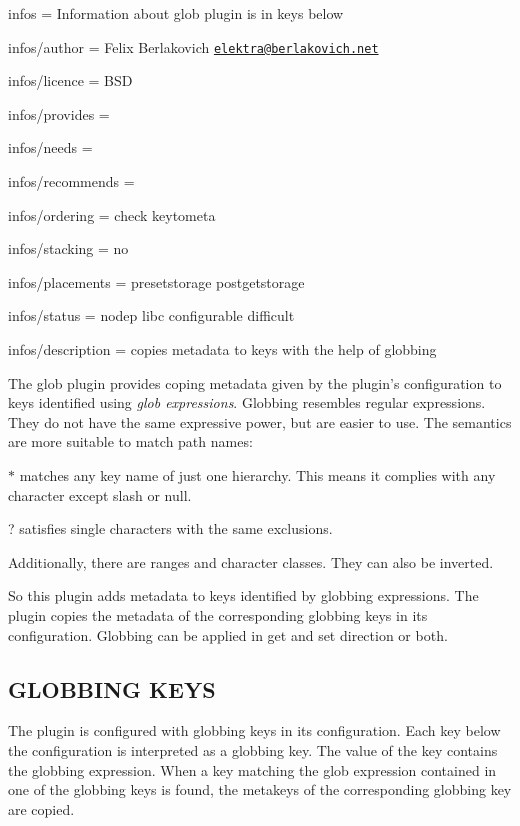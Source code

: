 
\begin{DoxyItemize}
\item infos = Information about glob plugin is in keys below
\item infos/author = Felix Berlakovich \href{mailto:elektra@berlakovich.net}{\tt elektra@berlakovich.\+net}
\item infos/licence = B\+S\+D
\item infos/provides =
\item infos/needs =
\item infos/recommends =
\item infos/ordering = check keytometa
\item infos/stacking = no
\item infos/placements = presetstorage postgetstorage
\item infos/status = nodep libc configurable difficult
\item infos/description = copies metadata to keys with the help of globbing
\end{DoxyItemize}

The glob plugin provides coping metadata given by the plugin's configuration to keys identified using {\itshape glob expressions}. Globbing resembles regular expressions. They do not have the same expressive power, but are easier to use. The semantics are more suitable to match path names\+:


\begin{DoxyItemize}
\item {\ttfamily $\ast$} matches any key name of just one hierarchy. This means it complies with any character except slash or null.
\item {\ttfamily ?} satisfies single characters with the same exclusions.
\item Additionally, there are ranges and character classes. They can also be inverted.
\end{DoxyItemize}

So this plugin adds metadata to keys identified by globbing expressions. The plugin copies the metadata of the corresponding globbing keys in its configuration. Globbing can be applied in get and set direction or both.

\subsection*{G\+L\+O\+B\+B\+I\+N\+G K\+E\+Y\+S}

The plugin is configured with globbing keys in its configuration. Each key below the configuration is interpreted as a globbing key. The value of the key contains the globbing expression. When a key matching the glob expression contained in one of the globbing keys is found, the metakeys of the corresponding globbing key are copied.

